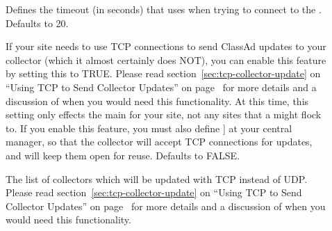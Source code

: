 \begin{description}
\item[] \label{param:QQueryTimeout}
  Defines the timeout (in seconds) that  uses when trying to
  connect to the .  Defaults to 20.

\item[]
  \label{param:UpdateCollectorWithTcp}
  If your site needs to use TCP connections to send ClassAd updates to
  your collector (which it almost certainly does NOT), you can enable
  this feature by setting this to TRUE.
  Please read section~\ref{sec:tcp-collector-update} on ``Using TCP to
  Send Collector Updates'' on page~\pageref{sec:tcp-collector-update}
  for more details and a discussion of when you would need this
  functionality. 
  At this time, this setting only effects the main 
  for your site, not any sites that a  might flock to. 
  If you enable this feature, you must also define
  ] at your central manager, so
  that the collector will accept TCP connections for updates, and will
  keep them open for reuse.
  Defaults to FALSE.

\item[]
  \label{param:TcpUpdateCollectors}
  The list of collectors which will be updated with TCP instead of UDP.
  Please read section~\ref{sec:tcp-collector-update} on ``Using TCP to
  Send Collector Updates'' on page~\pageref{sec:tcp-collector-update}
  for more details and a discussion of when you would need this
  functionality. 


\end{description}
